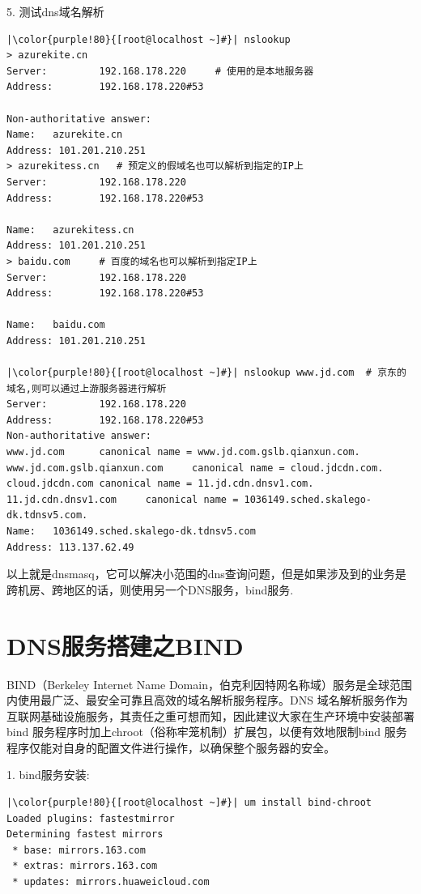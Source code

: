 \begin{ascboxB}{5. 测试dns域名解析}
\begin{verbatim}
|\color{purple!80}{[root@localhost ~]#}| nslookup
> azurekite.cn
Server:         192.168.178.220     # 使用的是本地服务器
Address:        192.168.178.220#53

Non-authoritative answer:
Name:   azurekite.cn
Address: 101.201.210.251
> azurekitess.cn   # 预定义的假域名也可以解析到指定的IP上
Server:         192.168.178.220
Address:        192.168.178.220#53

Name:   azurekitess.cn
Address: 101.201.210.251
> baidu.com     # 百度的域名也可以解析到指定IP上
Server:         192.168.178.220
Address:        192.168.178.220#53

Name:   baidu.com
Address: 101.201.210.251

|\color{purple!80}{[root@localhost ~]#}| nslookup www.jd.com  # 京东的域名,则可以通过上游服务器进行解析
Server:         192.168.178.220
Address:        192.168.178.220#53
Non-authoritative answer:
www.jd.com      canonical name = www.jd.com.gslb.qianxun.com.
www.jd.com.gslb.qianxun.com     canonical name = cloud.jdcdn.com.
cloud.jdcdn.com canonical name = 11.jd.cdn.dnsv1.com.
11.jd.cdn.dnsv1.com     canonical name = 1036149.sched.skalego-dk.tdnsv5.com.
Name:   1036149.sched.skalego-dk.tdnsv5.com
Address: 113.137.62.49
\end{verbatim}
\end{ascboxB}
\btrule{}

以上就是dnsmasq，它可以解决小范围的dns查询问题，但是如果涉及到的业务是跨机房、跨地区的话，则使用另一个DNS服务，bind服务.

\section{DNS服务搭建之BIND}
BIND（Berkeley Internet Name Domain，伯克利因特网名称域）服务是全球范围内使用最广泛、最安全可靠且高效的域名解析服务程序。DNS 域名解析服务作为互联网基础设施服务，其责任之重可想而知，因此建议大家在生产环境中安装部署bind 服务程序时加上chroot（俗称牢笼机制）扩展包，以便有效地限制bind 服务程序仅能对自身的配置文件进行操作，以确保整个服务器的安全。

\begin{ascboxB}{1.  bind服务安装:}
\begin{verbatim}
|\color{purple!80}{[root@localhost ~]#}| um install bind-chroot
Loaded plugins: fastestmirror
Determining fastest mirrors
 * base: mirrors.163.com
 * extras: mirrors.163.com
 * updates: mirrors.huaweicloud.com
\end{verbatim}
\end{ascboxB}


